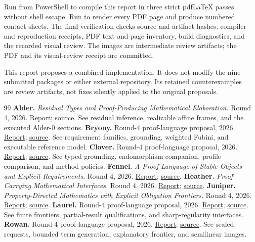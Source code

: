\documentclass[11pt,letterpaper]{article}
\newcommand{\code}[1]{\texttt{\detokenize{#1}}}
\theoremstyle{definition}\newtheorem{definition}[proposition]{Definition}
\theoremstyle{remark}\newtheorem{remark}[proposition]{Remark}
\begin{document}
Run \code{./build.ps1} from PowerShell to compile this report in three strict
pdfLaTeX passes without shell escape. Run \code{python -B scripts/render_review.py}
to render every PDF page and produce numbered contact sheets. The final
verification checks source and artifact hashes, compiler and reproduction
receipts, PDF text and page inventory, build diagnostics, and the recorded
visual review. The images are intermediate review artifacts; the PDF and
its visual-review receipt are committed.

This report proposes a combined implementation. It does not modify the nine
submitted packages or either external repository. Its retained counterexamples
are review artifacts, not fixes silently applied to the original proposals.

\begin{thebibliography}{99}
 \textbf{Alder.} \emph{Residual Types and Proof-Producing Mathematical Elaboration.} Round 4, 2026. \href{../ideas/Alder/Alder.pdf}{Report}; \href{../ideas/Alder/Alder.tex}{source}. See residual inference, realizable affine frames, and the executed Alder-0 sections.
 \textbf{Bryony.} Round-4 proof-language proposal, 2026. \href{../ideas/Bryony/Bryony.pdf}{Report}; \href{../ideas/Bryony/Bryony.tex}{source}. See requirement families, grounding, weighted Fubini, and executable reference model.
 \textbf{Clover.} Round-4 proof-language proposal, 2026. \href{../ideas/Clover/Clover.pdf}{Report}; \href{../ideas/Clover/Clover.tex}{source}. See typed grounding, endomorphism companion, profile comparison, and method policies.
 \textbf{Fennel.} \emph{A Proof Language of Stable Objects and Explicit Requirements.} Round 4, 2026. \href{../ideas/Fennel/Fennel.pdf}{Report}; \href{../ideas/Fennel/Fennel.tex}{source}.
 \textbf{Heather.} \emph{Proof-Carrying Mathematical Interfaces.} Round 4, 2026. \href{../ideas/Heather/Heather.pdf}{Report}; \href{../ideas/Heather/Heather.tex}{source}.
 \textbf{Juniper.} \emph{Property-Directed Mathematics with Explicit Obligation Frontiers.} Round 4, 2026. \href{../ideas/Juniper/Juniper.pdf}{Report}; \href{../ideas/Juniper/Juniper.tex}{source}.
 \textbf{Laurel.} Round-4 proof-language proposal, 2026. \href{../ideas/Laurel/Laurel.pdf}{Report}; \href{../ideas/Laurel/Laurel.tex}{source}. See finite frontiers, partial-result qualifications, and sharp-regularity interfaces.
 \textbf{Rowan.} Round-4 proof-language proposal, 2026. \href{../ideas/Rowan/Rowan.pdf}{Report}; \href{../ideas/Rowan/Rowan.tex}{source}. See sealed requests, bounded term generation, explanatory frontier, and semilinear images.

\end{thebibliography}
\end{document}

